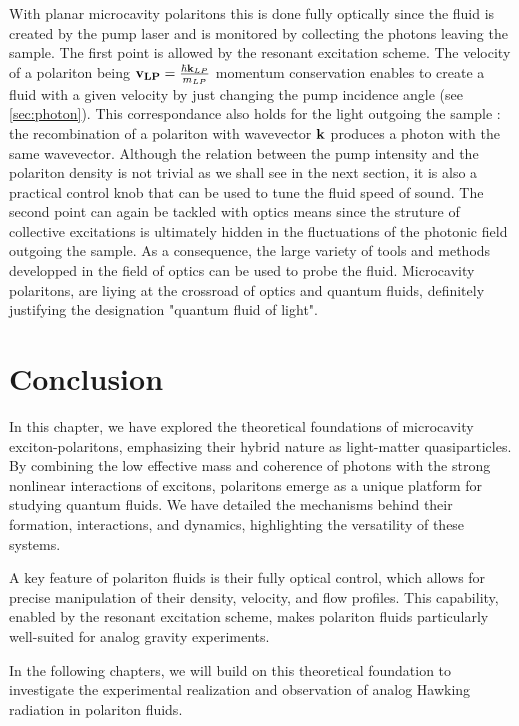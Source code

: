 With planar microcavity polaritons this is done fully optically since the fluid is created by the pump laser and is monitored by collecting the photons leaving the sample. 
The first point is allowed by the resonant excitation scheme. The velocity of a polariton being $\mathbf{v_{LP}}=\frac{\hbar \mathbf{k}_{LP}}{m_{LP}}$ momentum conservation enables to create a fluid with a given velocity by just changing the pump incidence angle (see \autoref{sec:photon}).
This correspondance also holds for the light outgoing the sample : the recombination of a polariton with wavevector $\mathbf{k}$ produces a photon with the same wavevector. 
Although the relation between the pump intensity and the polariton density is not trivial as we shall see in the next section, it is also a practical control knob that can be used to tune the fluid speed of sound.
The second point can again be tackled with optics means since the struture of collective excitations is ultimately hidden in the fluctuations of the photonic field outgoing the sample. As a consequence, the large
variety of tools and methods developped in the field of optics can be used to probe the fluid. Microcavity polaritons, are liying at the crossroad of optics and quantum fluids, definitely justifying the designation "quantum fluid of light".

\section{Conclusion}

In this chapter, we have explored the theoretical foundations of microcavity exciton-polaritons, emphasizing their hybrid nature as light-matter quasiparticles. 
By combining the low effective mass and coherence of photons with the strong nonlinear interactions of excitons, polaritons emerge as a unique platform for studying quantum fluids. 
We have detailed the mechanisms behind their formation, interactions, and dynamics, highlighting the versatility of these systems.

A key feature of polariton fluids is their fully optical control, which allows for precise manipulation of their density, velocity, and flow profiles. 
This capability, enabled by the resonant excitation scheme, makes polariton fluids particularly well-suited for analog gravity experiments. 

In the following chapters, we will build on this theoretical foundation to investigate the experimental realization and observation of analog Hawking radiation in polariton fluids.